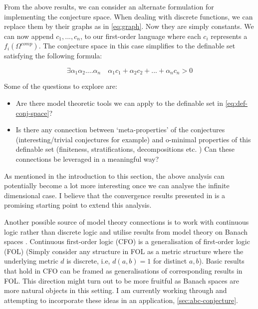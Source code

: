From the above results, we can consider an alternate formulation for implementing the conjecture space. When dealing with discrete functions, we can replace them by their graphs as in \ref{eq:graph}. Now they are simply constants. We can now append $c_1,...,c_n$, to our first-order language where each $c_i$ represents a $f_i(\Omega^{comp})$. The conjecture space in this case simplifies to the definable set satisfying the following formula:

\begin{equation}
    \label{eq:def-conj-space}
    \exists\alpha_1\alpha_2....\alpha_n\quad\alpha_1c_1+\alpha_2c_2+...+\alpha_nc_n > 0
\end{equation}

Some of the questions to explore are: 
\begin{itemize}
    \item Are there model theoretic tools we can apply to the definable set in \ref{eq:def-conj-space}?
    \item Is there any connection between `meta-properties' of the conjectures (interesting/trivial conjectures for example) and o-minimal properties of this definable set (finiteness, stratifications, decompositions etc. \cite{Dries_1998}) Can these connections be leveraged in a meaningful way?
\end{itemize}

As mentioned in the introduction to this section, the above analysis can potentially become a lot more interesting once we can analyse the infinite dimensional case. I believe that the convergence results presented in \cite{thomasConvergenceResultsFunction2012} is a promising starting point to extend this analysis.
\begin{remark}
    Another possible source of model theory connections is to work with continuous logic rather than discrete logic and utilise results from model theory on Banach spaces \cite{yaacovModelTheoryMetric2008}. Continuous first-order logic (CFO) is a generalisation of first-order logic (FOL) (Simply consider any structure in FOL as a metric structure where the underlying metric $d$ is discrete, i.e, $d(a, b) = 1$ for distinct $a, b$). Basic results that hold in CFO can be framed as generalisations of corresponding results in FOL. 
    This direction might turn out to be more fruitful as Banach spaces are more natural objects in this setting. I am currently working through \cite{yaacovModelTheoryMetric2008} and attempting to incorporate these ideas in an application, \ref{sec:abc-conjecture}.   
\end{remark}

